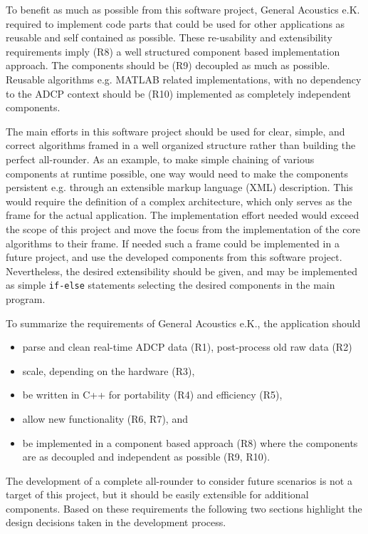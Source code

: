 To benefit as much as possible from this software project, General Acoustics e.K. required to implement code parts that could be used for other applications as reusable and self contained as possible. These re-usability and extensibility requirements imply (R8) a well structured component based implementation approach. The components should be (R9) decoupled as much as possible. Reusable algorithms e.g. MATLAB related implementations, with no dependency to the ADCP context should be (R10) implemented as completely independent components.

The main efforts in this software project should be used for clear, simple, and correct algorithms framed in a well organized structure rather than building the perfect all-rounder. As an example, to make simple chaining of various components at runtime possible, one way would need to make the components persistent e.g. through an extensible markup language (XML) description. This would require the definition of a complex architecture, which only serves as the frame for the actual application. The implementation effort needed would exceed the scope of this project and move the focus from the implementation of the core algorithms to their frame. If needed such a frame could be implemented in a future project, and use the developed components from this software project. Nevertheless, the desired extensibility should be given, and may be implemented as simple \texttt{if-else} statements selecting the desired components in the main program.

To summarize the requirements of General Acoustics e.K., the application should
\begin{itemize}
\item parse and clean real-time ADCP data (R1), post-process old raw data (R2)
\item scale, depending on the hardware (R3),
\item be written in C++ for portability (R4) and efficiency (R5),
\item allow new functionality (R6, R7), and
\item be implemented in a component based approach (R8) where the components are as decoupled and independent as possible (R9, R10).
\end{itemize}
The development of a complete all-rounder to consider future scenarios is not a target of this project, but it should be easily extensible for additional components. Based on these requirements the following two sections highlight the design decisions taken in the development process. 

